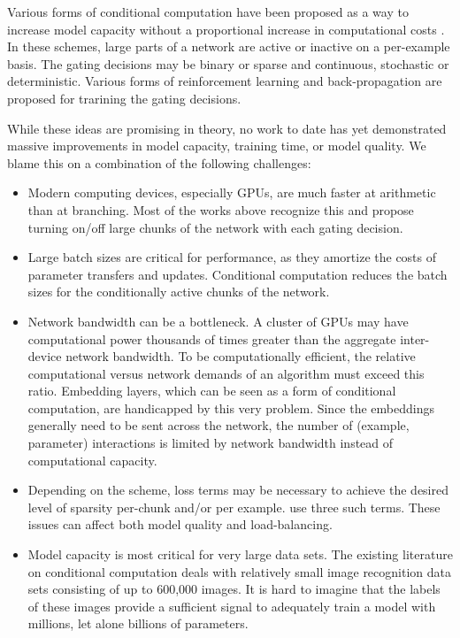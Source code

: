 \documentclass{article} %
\begin{document}
Various forms of conditional computation have been proposed as a way to increase model capacity without a proportional increase in computational costs \citep{Davis13:CondComp, Bengio13:CondComp, eigen2013learning, Denoyer14:CondComp,  Cho14, Bengio15:CondComp, Almahairi15}.  In these schemes, large parts of a network are active or inactive on a per-example basis.  The gating decisions may be binary or sparse and continuous, stochastic or deterministic.  Various forms of reinforcement learning and back-propagation are proposed for trarining the gating decisions. 

While these ideas are promising in theory, no work to date has yet demonstrated massive improvements in model capacity, training time, or model quality.  We blame this on a combination of the following challenges:

\begin{itemize}
  \item Modern computing devices, especially GPUs, are much faster at arithmetic than at branching.   Most of the works above recognize this and propose turning on/off large chunks of the network with each gating decision.
  \item Large batch sizes are critical for performance, as they amortize the costs of parameter transfers and updates.  Conditional computation reduces the batch sizes for the conditionally active chunks of the network.
  \item Network bandwidth can be a bottleneck.  A cluster of GPUs may have computational power thousands of times greater than the aggregate inter-device network bandwidth.  To be computationally efficient, the relative computational versus network demands of an algorithm must exceed this ratio.   Embedding layers, which can be seen as a form of conditional computation, are handicapped by this very problem.  Since the embeddings generally need to be sent across the network, the number of (example, parameter) interactions is limited by network bandwidth instead of computational capacity.
  \item Depending on the scheme, loss terms may be necessary to achieve the desired level of sparsity per-chunk and/or per example. \cite{Bengio15:CondComp} use three such terms.  These issues can affect both model quality and load-balancing.
  \item Model capacity is most critical for very large data sets.  The existing literature on conditional computation deals with relatively small image recognition data sets consisting of up to 600,000 images.  It is hard to imagine that the labels of these images provide a sufficient signal to adequately train a model with millions, let alone billions of parameters.
\end{itemize}
 
\end{document}
